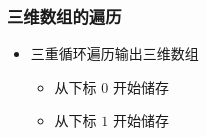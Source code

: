 \begin{frame}[fragile]
    \frametitle{三维数组的遍历}

    \begin{itemize}
        \item 三重循环遍历输出三维数组

            \begin{itemize}
                \item<2-> 从下标 $0$ 开始储存
                \item<4-> 从下标 $1$ 开始储存
            \end{itemize}
    \end{itemize}
\end{frame}

